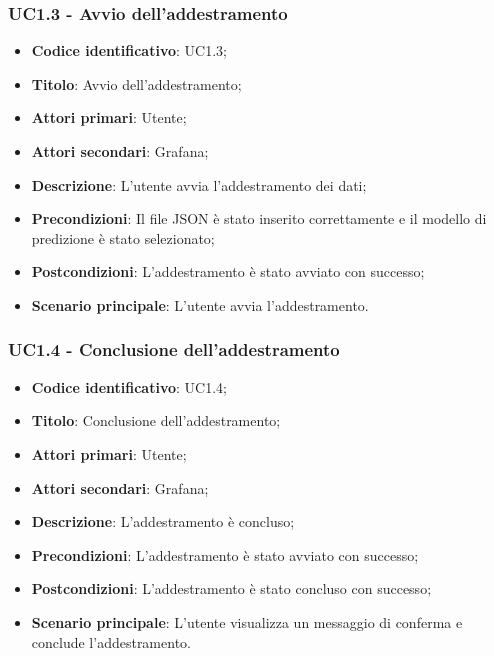\subsubsection{UC1.3 - Avvio dell'addestramento}
\begin{itemize}
	\item \textbf{Codice identificativo}: UC1.3;
	\item \textbf{Titolo}: Avvio dell'addestramento;
	\item \textbf{Attori primari}: Utente;
	\item \textbf{Attori secondari}: Grafana\glo;
	\item \textbf{Descrizione}: L'utente avvia l'addestramento dei dati;
	\item \textbf{Precondizioni}: Il file JSON è stato inserito correttamente e il modello di predizione è stato selezionato;
	\item \textbf{Postcondizioni}: L'addestramento è stato avviato con successo;
	\item \textbf{Scenario principale}: L'utente avvia l'addestramento.
\end{itemize}

\subsubsection{UC1.4 - Conclusione dell'addestramento}
\begin{itemize}
	\item \textbf{Codice identificativo}: UC1.4;
	\item \textbf{Titolo}: Conclusione dell'addestramento;
	\item \textbf{Attori primari}: Utente;
	\item \textbf{Attori secondari}: Grafana\glo;
	\item \textbf{Descrizione}: L'addestramento è concluso;
	\item \textbf{Precondizioni}: L'addestramento è stato avviato con successo;
	\item \textbf{Postcondizioni}: L'addestramento è stato concluso con successo;
	\item \textbf{Scenario principale}: L'utente visualizza un messaggio di conferma e conclude l'addestramento.
\end{itemize}

